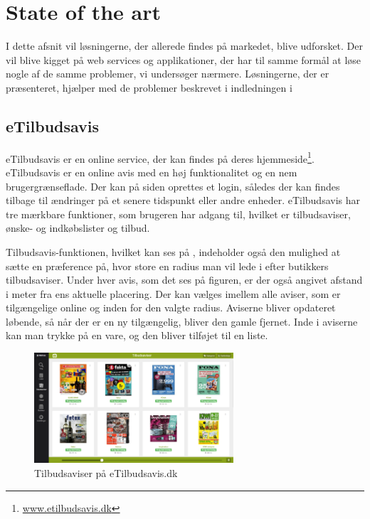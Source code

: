 \chapter{State of the art}
I dette afsnit vil løsningerne, der allerede findes på markedet, blive udforsket.
Der vil blive kigget på web services og applikationer, der har til samme formål at løse nogle af de samme problemer, vi undersøger nærmere.
Løsningerne, der er præsenteret, hjælper med de problemer beskrevet i indledningen i 

\section{eTilbudsavis}
eTilbudsavis er en online service, der kan findes på deres hjemmeside\footnote{\underline{www.etilbudsavis.dk}}. eTilbudsavis er en online avis med en høj funktionalitet og en nem brugergrænseflade.
Der kan på siden oprettes et login, således der kan findes tilbage til ændringer på et senere tidspunkt eller andre enheder.
eTilbudsavis har tre mærkbare funktioner, som brugeren har adgang til, hvilket er tilbudsaviser, ønske- og indkøbslister og tilbud.

Tilbudsavis-funktionen, hvilket kan ses på , indeholder også den mulighed at sætte en præference på, hvor store en radius man vil lede i efter butikkers tilbudsaviser.
Under hver avis, som det ses på figuren, er der også angivet afstand i meter fra ens aktuelle placering. 
Der kan vælges imellem alle aviser, som er tilgængelige online og inden for den valgte radius. 
Aviserne bliver opdateret løbende, så når der er en ny tilgængelig, bliver den gamle fjernet. 
Inde i aviserne kan man trykke på en vare, og den bliver tilføjet til en liste.

\begin{figure}
\vspace{-20pt}	
	\begin{center}
		\includegraphics[width=0.66\textwidth]{images/Images/eTilbudsavis.PNG}
	\end{center}
	\vspace{-20pt}
	\caption{Tilbudsaviser på eTilbudsavis.dk}\label{ss:eTilbudsavis}
	\vspace{-20pt}
\end{figure}

